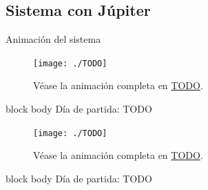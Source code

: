 \documentclass{beamer}
\begin{document}
        \subsection{Sistema con Júpiter}

            \begin{frame}{Animación del sistema}{}
                \begin{minipage}[t]{0.49\textwidth}
                    \begin{figure}[H!]
                        \texttt{[image: ./TODO]}
                        \caption*{Véase la animación completa en \url{TODO}.}
                        \label{fig:jupiter_1}
                    \end{figure}
                    \begin{beamercolorbox}[sep=5pt,center]{block body}
                        \centering
                        \small{Día de partida: TODO}
                    \end{beamercolorbox}
                \end{minipage}
                \hfill
                \begin{minipage}[t]{0.49\textwidth}
                    \begin{figure}[H!]
                        \texttt{[image: ./TODO]}
                        \caption*{Véase la animación completa en \url{TODO}.}
                        \label{fig:jupiter_2}
                    \end{figure}
                    \begin{beamercolorbox}[sep=5pt,center]{block body}
                        \centering
                        \small{Día de partida: TODO}
                    \end{beamercolorbox}
                \end{minipage}
            \end{frame}
\end{document}
